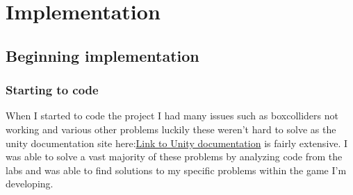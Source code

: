 \documentclass{report}
\begin{document}
\chapter{Implementation}
\section{Beginning implementation}

\subsection{Starting to code}
When I started to code the project I had many issues such as boxcolliders not working and various other problems luckily these weren't  hard to solve as the unity documentation site here:\href{https://docs.unity3d.com/Manual/index.html}{Link to Unity documentation} is fairly extensive.  I was able to solve a vast majority of these problems by analyzing code from the labs and was able to find solutions to my specific problems within the game I'm developing. 
\end{document}
